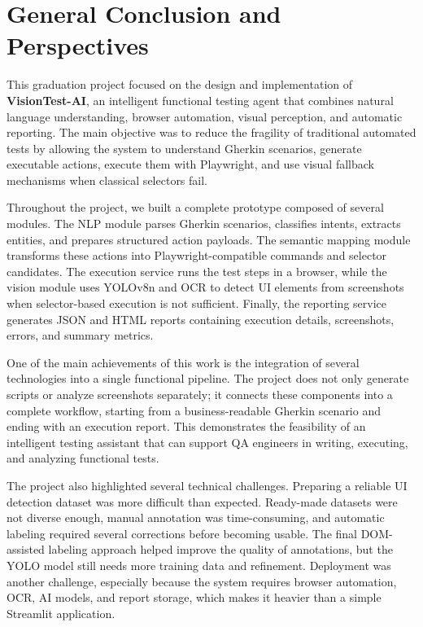 \chapter*{General Conclusion and Perspectives}
\label{chap:general_conclusion}

This graduation project focused on the design and implementation of \textbf{VisionTest-AI}, an intelligent functional testing agent that combines natural language understanding, browser automation, visual perception, and automatic reporting. The main objective was to reduce the fragility of traditional automated tests by allowing the system to understand Gherkin scenarios, generate executable actions, execute them with Playwright, and use visual fallback mechanisms when classical selectors fail.

Throughout the project, we built a complete prototype composed of several modules. The NLP module parses Gherkin scenarios, classifies intents, extracts entities, and prepares structured action payloads. The semantic mapping module transforms these actions into Playwright-compatible commands and selector candidates. The execution service runs the test steps in a browser, while the vision module uses YOLOv8n and OCR to detect UI elements from screenshots when selector-based execution is not sufficient. Finally, the reporting service generates JSON and HTML reports containing execution details, screenshots, errors, and summary metrics.

One of the main achievements of this work is the integration of several technologies into a single functional pipeline. The project does not only generate scripts or analyze screenshots separately; it connects these components into a complete workflow, starting from a business-readable Gherkin scenario and ending with an execution report. This demonstrates the feasibility of an intelligent testing assistant that can support QA engineers in writing, executing, and analyzing functional tests.

The project also highlighted several technical challenges. Preparing a reliable UI detection dataset was more difficult than expected. Ready-made datasets were not diverse enough, manual annotation was time-consuming, and automatic labeling required several corrections before becoming usable. The final DOM-assisted labeling approach helped improve the quality of annotations, but the YOLO model still needs more training data and refinement. Deployment was another challenge, especially because the system requires browser automation, OCR, AI models, and report storage, which makes it heavier than a simple Streamlit application.

